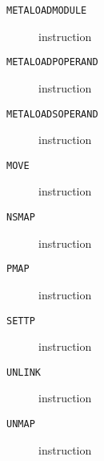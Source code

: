 \clearpage
\begin{description}
\item[\texttt{METALOADMODULE}] instruction\\

\end{description}
\clearpage
\begin{description}
\item[\texttt{METALOADPOPERAND}] instruction\\

\end{description}
\clearpage
\begin{description}
\item[\texttt{METALOADSOPERAND}] instruction\\

\end{description}
\clearpage
\begin{description}
\item[\texttt{MOVE}] instruction\\

\end{description}
\clearpage
\begin{description}
\item[\texttt{NSMAP}] instruction\\

\end{description}
\clearpage
\begin{description}
\item[\texttt{PMAP}] instruction\\

\end{description}
\clearpage
\begin{description}
\item[\texttt{SETTP}] instruction\\

\end{description}
\clearpage
\begin{description}
\item[\texttt{UNLINK}] instruction\\

\end{description}
\clearpage
\begin{description}
\item[\texttt{UNMAP}] instruction\\

\end{description}
\clearpage
